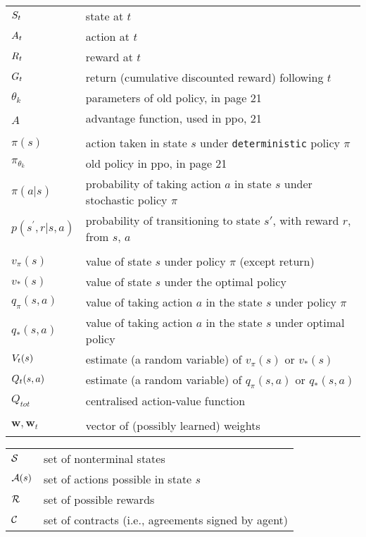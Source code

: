 \begin{tabular}{p{1.6cm} p{12cm}}
$S_t$  & state at $t$ \\
$A_t$  & action at $t$ \\
$R_t$  & reward at $t$ \\
$G_t$  & return (cumulative discounted reward) following $t$ \\
$\theta_{k}$ & parameters of old policy, in page 21 \\
$\hat{A}$ & advantage function, used in ppo, 21\\

\\
$\pi(s)$  & action taken in state $s$ under \texttt{deterministic} policy $\pi$ \\
$\pi_{\theta_{k}}$ & old policy in ppo, in page 21 \\
$\pi(a|s)$  & probability of taking action $a$ in state $s$ under stochastic policy $\pi$ \\
$p(s^{\prime},r|s,a)$  & probability of transitioning to state $s'$, with reward $r$, from $s$, $a$ \\
\\
$v_\pi(s)$ & value of state $s$ under policy $\pi$ (except return) \\
$v_*(s)$ & value of state $s$ under the optimal policy \\
$q_{\pi}(s, a)$ & value of taking action $a$ in the state $s$ under policy $\pi$ \\
$q_{*}(s, a)$ & value of taking action $a$ in the state $s$ under optimal policy \\
$V_{t}(s)$ & estimate (a random variable) of $v_{\pi}(s)$ or $v_{*}(s)$ \\ 
$Q_{t}(s, a)$ & estimate (a random variable) of $q_{\pi}(s, a)$ or $q_{*}(s, a)$ \\
$Q_{tot}$ &  centralised action-value function \\
\\
$\mathbf{w}, \mathbf{w}_{t}$ & vector of (possibly learned) weights \\


\end{tabular}


\begin{tabular}{p{1.5cm} p{12cm}}
$\mathcal{S}$ & set of nonterminal states \\
$\mathcal{A}(s)$ & set of actions possible in state $s$ \\
$\mathcal{R}$ & set of possible rewards \\
$\mathcal{C}$ & set of contracts (i.e., agreements signed by agent) \\
\end{tabular}